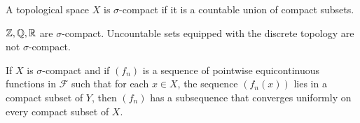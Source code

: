 \begin{df}
    A topological space $X$ is $\sigma$-compact if it is a countable union of compact subsets.
\end{df}

\begin{ex}
    ${\mathbb Z }, {\mathbb Q}, {\mathbb R}$ are $\sigma$-compact. Uncountable sets equipped with the discrete topology are not $\sigma$-compact.
\end{ex}

\begin{prop}
    If $X$ is $\sigma$-compact and if $(f_n)$ is a sequence of pointwise equicontinuous functions in $\mathcal F$ such that for each $x \in X$, the sequence $(f_n(x))$ lies in a compact subset of $Y$, then $(f_n)$ has a subsequence that converges uniformly on every compact subset of $X$.
\end{prop}